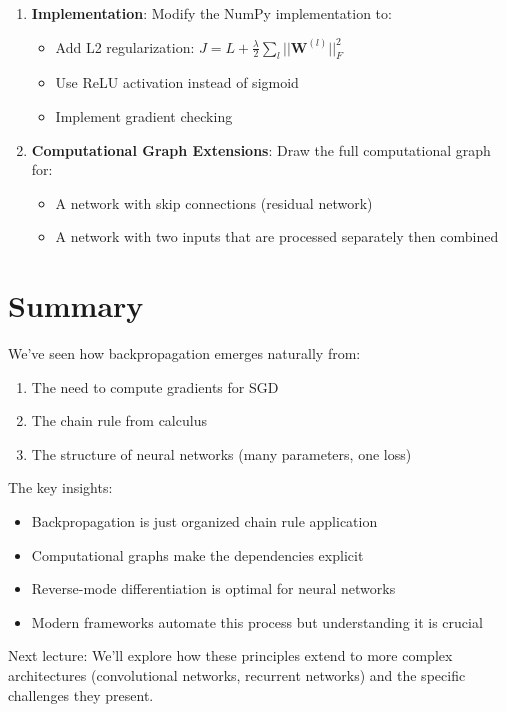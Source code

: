 \documentclass{article}
\begin{document}
\begin{enumerate}
\item \textbf{Implementation}: Modify the NumPy implementation to:
\begin{itemize}
\item Add L2 regularization: $J = L + \frac{\lambda}{2}\sum_l ||\mathbf{W}^{(l)}||^2_F$
\item Use ReLU activation instead of sigmoid
\item Implement gradient checking
\end{itemize}

\item \textbf{Computational Graph Extensions}: Draw the full computational graph for:
\begin{itemize}
\item A network with skip connections (residual network)
\item A network with two inputs that are processed separately then combined
\end{itemize}

\end{enumerate}

\section{Summary}

We've seen how backpropagation emerges naturally from:
\begin{enumerate}
\item The need to compute gradients for SGD
\item The chain rule from calculus
\item The structure of neural networks (many parameters, one loss)
\end{enumerate}

The key insights:
\begin{itemize}
\item Backpropagation is just organized chain rule application
\item Computational graphs make the dependencies explicit
\item Reverse-mode differentiation is optimal for neural networks
\item Modern frameworks automate this process but understanding it is crucial
\end{itemize}

Next lecture: We'll explore how these principles extend to more complex architectures (convolutional networks, recurrent networks) and the specific challenges they present.
\end{document}
